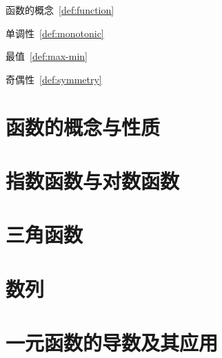 \documentclass[../main.tex]{subfiles}
\begin{document}
\begin{introduction}
    \item 函数的概念~\ref{def:function}
    \item 单调性~\ref{def:monotonic}
    \item 最值~\ref{def:max-min}
    \item 奇偶性~\ref{def:symmetry}
\end{introduction}

\section{函数的概念与性质}
\begin{definition}[函数]\label{def:function}

\end{definition}

\section{指数函数与对数函数}

\section{三角函数}

\section{数列}

\section{一元函数的导数及其应用}
\end{document}
